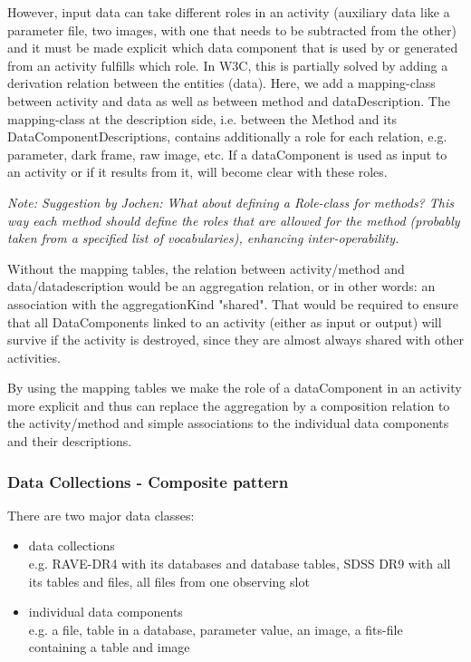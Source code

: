 \documentclass[11pt,a4paper]{ivoa}
\begin{document}
However, input data can take different roles in an activity (auxiliary data like a parameter file, two images, with one that needs to be subtracted from the other) and it must be made explicit which data component that is used by or generated from an activity fulfills which role. In W3C, this is partially solved by adding a derivation relation between the entities (data). Here, we add a mapping-class between activity and data as well as between method and dataDescription. The mapping-class at the description side, i.e. between the Method and its DataComponentDescriptions, contains additionally a role for each relation, e.g. parameter, dark frame, raw image, etc.  If a dataComponent is used as input to an activity or if it results from it, will become clear with these roles.

\emph{Note: Suggestion by Jochen: What about defining a Role-class for methods? This way each method should define the roles that are allowed for the method (probably taken from a specified list of vocabularies), enhancing inter-operability.}

Without the mapping tables, the relation between activity/method and data/datadescription would be an aggregation relation, or in other words: an association with the aggregationKind "shared". That would be required to ensure that all DataComponents linked to an activity (either as input or output) will survive if the activity is destroyed, since they are almost always shared with other activities. 

By using the mapping tables we make the role of a dataComponent in an activity more explicit and thus can replace the aggregation by a composition relation to the activity/method and simple associations to the individual data components and their descriptions. 


\subsubsection{Data Collections - Composite pattern}

There are two major data classes: 

\begin{itemize} 
\item data collections \\e.g. RAVE-DR4 with its databases and database tables, SDSS DR9 with 
all its tables and files, all files from one observing slot\\

\item individual data components\\
e.g. a file, table in a database, parameter value, an image, a fits-file containing a table and image

\end{itemize}
\end{document}
